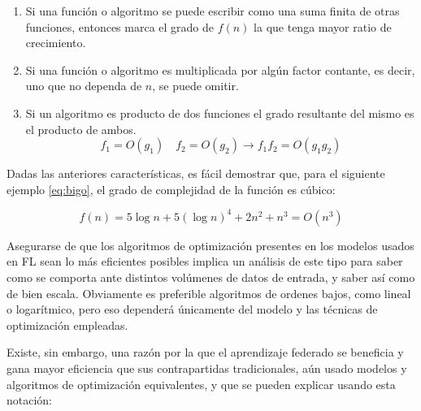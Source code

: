 \documentclass[00-Trabajo_Final.tex]{subfiles}
\begin{document}
\begin{enumerate}
    \item Si una función o algoritmo se puede escribir como una suma finita de otras funciones, entonces marca el grado de $f(n)$ la que tenga mayor ratio de crecimiento.
    \item Si una función o algoritmo es multiplicada por algún factor contante, es decir, uno que no dependa de $n$, se puede omitir.
    \item Si un algoritmo es producto de dos funciones el grado resultante del mismo es el producto de ambos.
    \begin{equation}
        f_1 = O(g_1) \quad f_2 = O(g_2) \rightarrow f_1 f_2 = O(g_1 g_2)
    \end{equation}
\end{enumerate}

Dadas las anteriores características, es fácil demostrar que, para el siguiente ejemplo \eqref{eq:bigo}, el grado de complejidad de la función es cúbico:

\begin{equation}
    \label{eq:bigo}
    f(n) = 5 \log n + 5 (\log n )^4 + 2n^2 + n^3 = O(n^3)
\end{equation}

Asegurarse de que los algoritmos de optimización presentes en los modelos usados en FL sean lo más eficientes posibles implica un análisis de este tipo para saber como se comporta ante distintos volúmenes de datos de entrada, y saber así como de bien escala. Obviamente es preferible algoritmos de ordenes bajos, como lineal o logarítmico, pero eso dependerá únicamente del modelo y las técnicas de optimización empleadas.

\vspace{1em}

Existe, sin embargo, una razón por la que el aprendizaje federado se beneficia y gana mayor eficiencia que sus contrapartidas tradicionales, aún usado modelos y algoritmos de optimización equivalentes, y que se pueden explicar usando esta notación:
\end{document}
